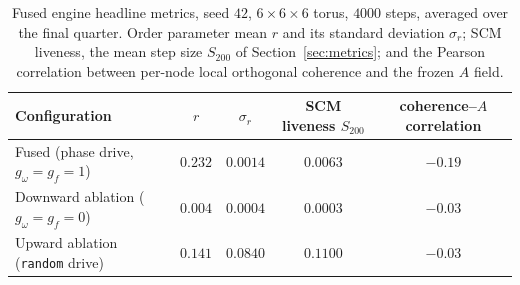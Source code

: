 \documentclass[11pt]{article}
\newcommand{\enRfull}{0.232}
\newcommand{\enRstdFull}{0.0014}
\newcommand{\enLiveFull}{0.0063}
\newcommand{\enCorrFull}{-0.19}
\newcommand{\enRdown}{0.004}
\newcommand{\enRstdDown}{0.0004}
\newcommand{\enLiveDown}{0.0003}
\newcommand{\enCorrDown}{-0.03}
\newcommand{\enRup}{0.141}
\newcommand{\enRstdUp}{0.0840}
\newcommand{\enLiveUp}{0.1100}
\newcommand{\enCorrUp}{-0.03}
\begin{document}
\begin{table}[H]
\centering
\caption{Fused engine headline metrics, seed $42$, $6\times6\times6$ torus, $4000$ steps, averaged over the final
quarter. Order parameter mean $r$ and its standard deviation $\sigma_r$; SCM liveness, the mean step size $S_{200}$ of
Section~\ref{sec:metrics}; and the Pearson correlation between per-node local orthogonal coherence and the frozen $A$
field.}
\label{tab:engine}
\begin{tabular}{lcccc}
\toprule
Configuration & $r$ & $\sigma_r$ & \shortstack{SCM liveness\\ $S_{200}$} & \shortstack{coherence--$A$\\ correlation} \\
\midrule
Fused (phase drive, $g_\omega{=}g_f{=}1$) & $\enRfull$ & $\enRstdFull$ & $\enLiveFull$ & $\enCorrFull$ \\
Downward ablation ($g_\omega{=}g_f{=}0$)  & $\enRdown$ & $\enRstdDown$ & $\enLiveDown$ & $\enCorrDown$ \\
Upward ablation (\texttt{random} drive)   & $\enRup$   & $\enRstdUp$   & $\enLiveUp$   & $\enCorrUp$   \\
\bottomrule
\end{tabular}
\end{table}
\end{document}
